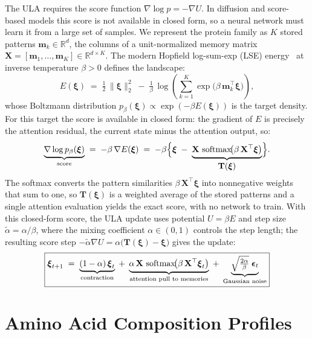 The ULA requires the score function $\nabla\log p = -\nabla U$. In
diffusion and score-based models this score is not available in closed form, so a neural
network must learn it from a large set of samples. We represent the protein family as $K$ stored patterns
$\mathbf{m}_k\in\mathbb{R}^d$, the columns of a unit-normalized memory matrix
$\mathbf{X} = [\mathbf{m}_1,\dots,\mathbf{m}_K]\in\mathbb{R}^{d\times K}$.
The modern Hopfield log-sum-exp (LSE) energy~\cite{ramsauerHopfieldNetworksAll2021} at inverse temperature $\beta>0$ defines the
landscape:
\[
  E(\boldsymbol{\xi})
  \;=\;
  \tfrac{1}{2}\,\|\boldsymbol{\xi}\|_2^2
  \;-\;
  \tfrac{1}{\beta}\,\log\!\left(\sum_{k=1}^{K}\exp\!\bigl(\beta\,\mathbf{m}_k^{\top}\boldsymbol{\xi}\bigr)\right),
\]
whose Boltzmann distribution $p_\beta(\boldsymbol{\xi})\propto\exp(-\beta E(\boldsymbol{\xi}))$ is the target density. For this target the score is available in closed form: the
gradient of $E$ is precisely the attention residual, the current state minus the attention output, so:
\[
  \underbrace{\nabla\log p_\beta(\boldsymbol{\xi})}_{\text{score}}
  \;=\;
  -\beta\,\nabla E(\boldsymbol{\xi})
  \;=\;
  -\beta\Bigl\{\boldsymbol{\xi} \;-\;
  \underbrace{\mathbf{X}\,\operatorname{softmax}\!\bigl(\beta\,\mathbf{X}^{\top}\boldsymbol{\xi}\bigr)}_{\textstyle\mathbf{T}(\boldsymbol{\xi})}\Bigr\}.
\]
The softmax converts the pattern similarities $\beta\,\mathbf{X}^{\top}\boldsymbol{\xi}$ into
nonnegative weights that sum to one, so $\mathbf{T}(\boldsymbol{\xi})$ is a weighted average of
the stored patterns and a single attention evaluation yields the exact score, with no network to train. With this closed-form score, the ULA update uses
potential $U=\beta E$ and step size $\tilde\alpha=\alpha/\beta$, where the mixing coefficient $\alpha\in(0,1)$ controls
the step length; the resulting score step
$-\tilde\alpha\nabla U = \alpha\bigl(\mathbf{T}(\boldsymbol{\xi})-\boldsymbol{\xi}\bigr)$
gives the update:
\[
  \boxed{%
  \boldsymbol{\xi}_{t+1}
  \;=\;
  \underbrace{(1-\alpha)\,\boldsymbol{\xi}_t}_{\text{contraction}}
  \;+\;
  \underbrace{\alpha\,\mathbf{X}\,\operatorname{softmax}\!\bigl(\beta\,\mathbf{X}^{\top}\boldsymbol{\xi}_t\bigr)}_{\text{attention pull to memories}}
  \;+\;
  \underbrace{\sqrt{\tfrac{2\alpha}{\beta}}\;\boldsymbol{\epsilon}_t}_{\text{Gaussian noise}}
  }
\]


\section{Amino Acid Composition Profiles}\label{si:aa-freq}


